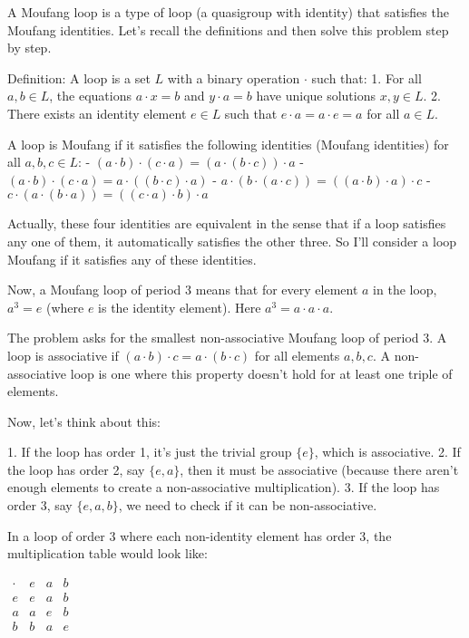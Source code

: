 \documentclass[12p]{article}
\newcounter{reasoningcounter}
\newenvironment{reasoning}[1][]
{\refstepcounter{reasoningcounter}%
\begin{tcolorbox}[
    title=Reasoning \thereasoningcounter: #1,
    colback=white, %
    colframe=gray,
    coltext=black, %
    fonttitle=\bfseries\normalsize,
    top=2mm,
    bottom=2mm,
    enlarge top initially by=5mm
]
\small
}
{\end{tcolorbox}}
\begin{document}
\begin{reasoning}
A Moufang loop is a type of loop (a quasigroup with identity) that satisfies the Moufang identities. Let's recall the definitions and then solve this problem step by step.

Definition: A loop is a set $L$ with a binary operation $\cdot$ such that:
1. For all $a, b \in L$, the equations $a \cdot x = b$ and $y \cdot a = b$ have unique solutions $x, y \in L$.
2. There exists an identity element $e \in L$ such that $e \cdot a = a \cdot e = a$ for all $a \in L$.

A loop is Moufang if it satisfies the following identities (Moufang identities) for all $a, b, c \in L$:
- $(a \cdot b) \cdot (c \cdot a) = (a \cdot (b \cdot c)) \cdot a$
- $(a \cdot b) \cdot (c \cdot a) = a \cdot ((b \cdot c) \cdot a)$
- $a \cdot (b \cdot (a \cdot c)) = ((a \cdot b) \cdot a) \cdot c$
- $c \cdot (a \cdot (b \cdot a)) = ((c \cdot a) \cdot b) \cdot a$

Actually, these four identities are equivalent in the sense that if a loop satisfies any one of them, it automatically satisfies the other three. So I'll consider a loop Moufang if it satisfies any of these identities.

Now, a Moufang loop of period 3 means that for every element $a$ in the loop, $a^3 = e$ (where $e$ is the identity element). Here $a^3 = a \cdot a \cdot a$.

The problem asks for the smallest non-associative Moufang loop of period 3. A loop is associative if $(a \cdot b) \cdot c = a \cdot (b \cdot c)$ for all elements $a, b, c$. A non-associative loop is one where this property doesn't hold for at least one triple of elements.

Now, let's think about this:

1. If the loop has order 1, it's just the trivial group $\{e\}$, which is associative.
2. If the loop has order 2, say $\{e, a\}$, then it must be associative (because there aren't enough elements to create a non-associative multiplication).
3. If the loop has order 3, say $\{e, a, b\}$, we need to check if it can be non-associative.

In a loop of order 3 where each non-identity element has order 3, the multiplication table would look like:

$\begin{array}{c|ccc}
\cdot & e & a & b \\
\hline
e & e & a & b \\
a & a & e & b \\
b & b & a & e \\
\end{array}$


\end{reasoning}
\end{document}
